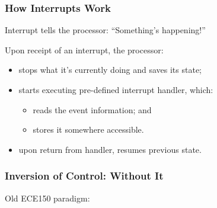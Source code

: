 \begin{frame}
\frametitle{How Interrupts Work}

\begin{changemargin}{1cm}
Interrupt tells the processor: ``Something's happening!''\vfill

Upon receipt of an interrupt, the processor:
\begin{itemize}
\item stops what it's currently doing and saves its state;
\item starts executing pre-defined \alert{interrupt handler}, which:
\begin{itemize}
\item reads the event information; and
\item stores it somewhere accessible.
\end{itemize}
\item upon return from handler, resumes previous state.
\end{itemize}
\end{changemargin}

\end{frame}

\begin{frame}
\frametitle{Inversion of Control: Without It}

\begin{changemargin}{1cm}
Old ECE150 paradigm:\\[2em]


\end{changemargin}

\end{frame}

